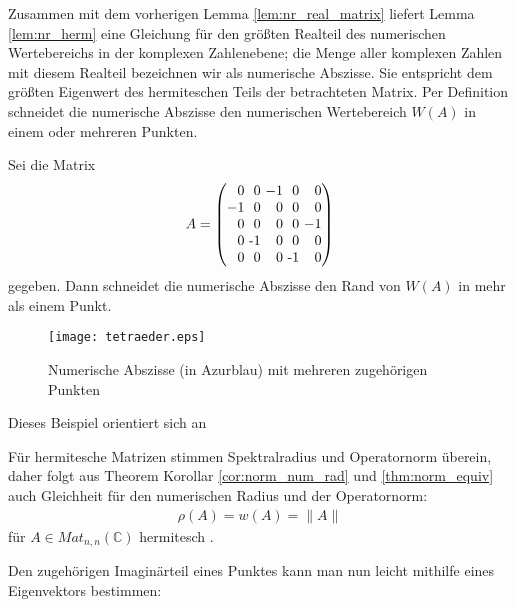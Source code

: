 \begin{rem} \label{rem:max_re_nr}
	Zusammen mit dem vorherigen Lemma \ref{lem:nr_real_matrix} liefert Lemma \ref{lem:nr_herm} eine Gleichung für den größten Realteil des numerischen Wertebereichs in der komplexen Zahlenebene; die Menge aller komplexen Zahlen mit diesem Realteil bezeichnen wir als numerische Abszisse. Sie entspricht dem größten Eigenwert des hermiteschen Teils der betrachteten Matrix. Per Definition schneidet die numerische Abszisse den numerischen Wertebereich $W(A)$ in einem oder mehreren Punkten.
\end{rem}

\begin{ex}
	Sei die Matrix 
	\begin{align}
		A = \begin{pmatrix}
			\phantom{-}0 $ \phantom{-}0 $ -1 $ \phantom{-}0 $ \phantom{-}0 \\ 
			-1 $ \phantom{-}0 $ \phantom{-}0 $ \phantom{-}0 $ \phantom{-}0 \\
			\phantom{-}0 $ \phantom{-}0 $ \phantom{-}0 $ \phantom{-}0 $ -1\\ 
			\phantom{-}0 $ -1 $ \phantom{-}0 $ \phantom{-}0 $ \phantom{-}0 \\
			\phantom{-}0 $ \phantom{-}0 $ \phantom{-}0 $ -1 $ \phantom{-}0
		\end{pmatrix}
	\end{align}
	gegeben. Dann schneidet die numerische Abszisse den Rand von $W(A)$ in mehr als einem Punkt.
	\begin{figure}[H]
		\caption{Numerische Abszisse (in Azurblau) mit mehreren zugehörigen Punkten}
		\texttt{[image: tetraeder.eps]}
	\end{figure}
	Dieses Beispiel orientiert sich an \parencite[S. 146]{gustafson1997numerical}
\end{ex}

\begin{rem} \label{rem:nr_herm}
	Für hermitesche Matrizen stimmen Spektralradius und Operatornorm überein, daher folgt aus Theorem Korollar \ref{cor:norm_num_rad} und \ref{thm:norm_equiv} auch Gleichheit für den numerischen Radius und der Operatornorm:
	\begin{align}
		\rho(A) = w(A) = \|A\|
	\end{align}
	für $A \in Mat_{n,n}(\mathbb{C})$ hermitesch \parencite[vgl. ][S. 266]{goldberg1982numerical} .
\end{rem}

Den zugehörigen Imaginärteil eines Punktes kann man nun leicht mithilfe eines Eigenvektors bestimmen:

